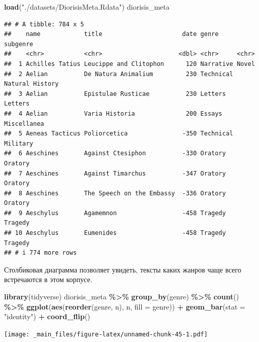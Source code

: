 \documentclass[
]{book}
\newenvironment{Shaded}{\begin{snugshade}}{\end{snugshade}}
\newcommand{\AttributeTok}[1]{\textcolor[rgb]{0.13,0.29,0.53}{#1}}
\newcommand{\FunctionTok}[1]{\textcolor[rgb]{0.13,0.29,0.53}{\textbf{#1}}}
\newcommand{\NormalTok}[1]{#1}
\newcommand{\SpecialCharTok}[1]{\textcolor[rgb]{0.81,0.36,0.00}{\textbf{#1}}}
\newcommand{\StringTok}[1]{\textcolor[rgb]{0.31,0.60,0.02}{#1}}
\theoremstyle{definition}
\theoremstyle{definition}
\theoremstyle{definition}
\theoremstyle{definition}
\theoremstyle{remark}
\begin{document}
\begin{Shaded}
\begin{Highlighting}[]
\FunctionTok{load}\NormalTok{(}\StringTok{"./datasets/DiorisisMeta.Rdata"}\NormalTok{)}
\NormalTok{diorisis\_meta}
\end{Highlighting}
\end{Shaded}

\begin{verbatim}
## # A tibble: 784 x 5
##    name            title                      date genre     subgenre       
##    <chr>           <chr>                     <dbl> <chr>     <chr>          
##  1 Achilles Tatius Leucippe and Clitophon      120 Narrative Novel          
##  2 Aelian          De Natura Animalium         230 Technical Natural History
##  3 Aelian          Epistulae Rusticae          230 Letters   Letters        
##  4 Aelian          Varia Historia              200 Essays    Miscellanea    
##  5 Aeneas Tacticus Poliorcetica               -350 Technical Military       
##  6 Aeschines       Against Ctesiphon          -330 Oratory   Oratory        
##  7 Aeschines       Against Timarchus          -347 Oratory   Oratory        
##  8 Aeschines       The Speech on the Embassy  -336 Oratory   Oratory        
##  9 Aeschylus       Agamemnon                  -458 Tragedy   Tragedy        
## 10 Aeschylus       Eumenides                  -458 Tragedy   Tragedy        
## # i 774 more rows
\end{verbatim}

Столбиковая диаграмма позволяет увидеть, тексты каких жанров чаще всего встречаются в этом корпусе.

\begin{Shaded}
\begin{Highlighting}[]
\FunctionTok{library}\NormalTok{(tidyverse)}
\NormalTok{diorisis\_meta }\SpecialCharTok{\%\textgreater{}\%}
  \FunctionTok{group\_by}\NormalTok{(genre) }\SpecialCharTok{\%\textgreater{}\%} 
  \FunctionTok{count}\NormalTok{() }\SpecialCharTok{\%\textgreater{}\%} 
  \FunctionTok{ggplot}\NormalTok{(}\FunctionTok{aes}\NormalTok{(}\FunctionTok{reorder}\NormalTok{(genre, n), n, }\AttributeTok{fill =}\NormalTok{ genre)) }\SpecialCharTok{+} 
  \FunctionTok{geom\_bar}\NormalTok{(}\AttributeTok{stat =} \StringTok{"identity"}\NormalTok{) }\SpecialCharTok{+} 
  \FunctionTok{coord\_flip}\NormalTok{()}
\end{Highlighting}
\end{Shaded}

\texttt{[image: \_main\_files/figure-latex/unnamed-chunk-45-1.pdf]}
\end{document}
